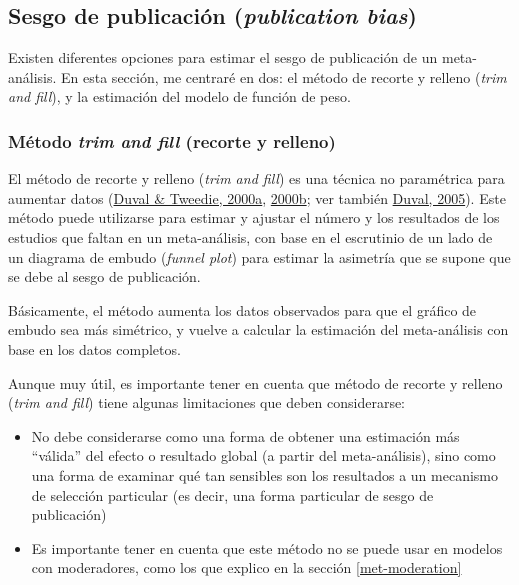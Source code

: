 \documentclass[
  bookmarksnumbered]{article}
\begin{document}
\hypertarget{sesgo-pub}{%
\subsection{\texorpdfstring{Sesgo de publicación (\emph{publication bias})}{Sesgo de publicación (publication bias)}}\label{sesgo-pub}}

Existen diferentes opciones para estimar el sesgo de publicación de un meta-análisis. En esta sección, me centraré en dos: el método de recorte y relleno (\emph{trim and fill}), y la estimación del modelo de función de peso.

\hypertarget{trim-fill}{%
\subsubsection{\texorpdfstring{Método \emph{trim and fill} (recorte y relleno)}{Método trim and fill (recorte y relleno)}}\label{trim-fill}}

El método de recorte y relleno (\emph{trim and fill}) es una técnica no paramétrica para aumentar datos (\protect\hyperlink{ref-duvalNonparametricTrimFill2000}{Duval \& Tweedie, 2000a}, \protect\hyperlink{ref-duvalTrimFillSimple2000}{2000b}; ver también \protect\hyperlink{ref-duvalTrimFillMethod2005}{Duval, 2005}). Este método puede utilizarse para estimar y ajustar el número y los resultados de los estudios que faltan en un meta-análisis, con base en el escrutinio de un lado de un diagrama de embudo (\emph{funnel plot}) para estimar la asimetría que se supone que se debe al sesgo de publicación.

Básicamente, el método aumenta los datos observados para que el gráfico de embudo sea más simétrico, y vuelve a calcular la estimación del meta-análisis con base en los datos completos.

Aunque muy útil, es importante tener en cuenta que método de recorte y relleno (\emph{trim and fill}) tiene algunas limitaciones que deben considerarse:

\begin{itemize}
\item
  No debe considerarse como una forma de obtener una estimación más ``válida'' del efecto o resultado global (a partir del meta-análisis), sino como una forma de examinar qué tan sensibles son los resultados a un mecanismo de selección particular (es decir, una forma particular de sesgo de publicación)
\item
  Es importante tener en cuenta que este método no se puede usar en modelos con moderadores, como los que explico en la sección \ref{met-moderation}
\end{itemize}
\end{document}
